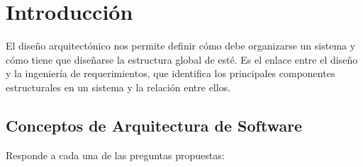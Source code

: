     \restoregeometry %

    \clearpage
    \tableofcontents




    \clearpage
    \vspace*{-16pt}
	\begin{center}
		{\textbf{\huge \theTitle}}
	\end{center}
    \vspace*{8pt}


	\section{Introducción}

	El diseño arquitectónico nos permite definir cómo debe organizarse
	un sistema y cómo tiene que diseñarse la estructura global de esté.
	Es el enlace entre el diseño y la ingeniería de requerimientos, que
	identifica los principales componentes estructurales en un sistema
	y la relación entre ellos.

	\subsection{Conceptos de Arquitectura de Software}

	Responde a cada una de las preguntas propuestas:

